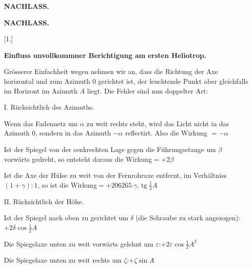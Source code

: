 \clearpage
\noindent{}\hfill{\small\textbf{NACHLASS.}}\hfill\null\par
\vspace*{32mm}
\begin{center}
{\Large\bfseries NACHLASS.}\par\vspace{15mm}
[1.]\par\medskip
\textbf{Einfluss unvollkommner Berichtigung am ersten Heliotrop.}
\end{center}
Grösserer Einfachheit wegen nehmen wir an, dass die Richtung der Axe
horizontal und zum Azimuth 0 gerichtet ist, der leuchtende Punkt aber gleichfalls
im Horizont im Azimuth $A$ liegt. Die Fehler sind nun doppelter Art:

\noindent I. Rücksichtlich des Azimuths.
\begin{list}{}{\setlength{\leftmargin}{9mm}\setlength{\labelwidth}{6mm}\setlength{\itemsep}{2pt}\setlength{\parsep}{0pt}\setlength{\topsep}{3pt}}
\item[1.] Wenn das Fadennetz um $\alpha$ zu weit rechts steht,
wird das Licht nicht in das Azimuth 0, sondern
in das Azimuth $-\alpha$ reflectirt. Also die Wirkung $=-\alpha$
\item[2.] Ist der Spiegel von der senkrechten Lage gegen
die Führungsstange um $\beta$ vorwärts gedreht, so
entsteht daraus die Wirkung\hfill $=+2\beta$
\item[3.] Ist die Axe der Hülse zu weit von der Fernrohraxe
entfernt, im Verhältniss $(1+\gamma):1$, so ist die
Wirkung\hfill $=+206265.\gamma.\operatorname{tg}\frac12 A$
\end{list}
\noindent II. Rücksichtlich der Höhe.
\begin{list}{}{\setlength{\leftmargin}{9mm}\setlength{\labelwidth}{6mm}\setlength{\itemsep}{2pt}\setlength{\parsep}{0pt}\setlength{\topsep}{3pt}}
\item[4.] Ist der Spiegel nach oben zu gerichtet um $\delta$
(die Schraube zu stark angezogen):\hfill $+2\delta\cos\frac12 A$
\item[5.] Die Spiegelaxe unten zu weit vorwärts gelehnt
um $\varepsilon$:\hfill $+2\varepsilon\cos\frac12 A^2$
\item[6.] Die Spiegelaxe unten zu weit rechts um $\zeta$:\hfill $+\zeta\sin A$
\end{list}

